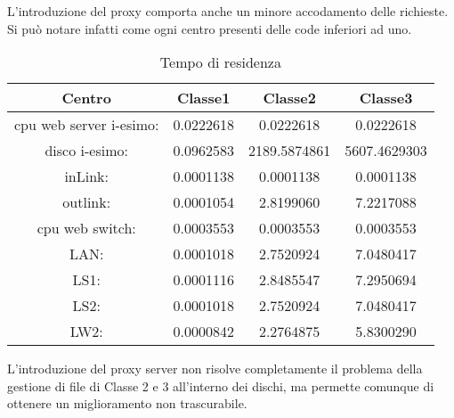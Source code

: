 L'introduzione del proxy comporta anche un minore accodamento delle richieste. Si può notare infatti come ogni centro presenti delle code inferiori ad uno.
\begin{table}[H]
\begin{center}
\begin{tabular}{||c|c|c|c||}
\hline
Centro &Classe1 &Classe2 &Classe3\\
\hline
\hline
 cpu web server i-esimo: 	&0.0222618	&0.0222618	&0.0222618	\\\hline
 disco i-esimo: 	&0.0962583	&2189.5874861	&5607.4629303	\\\hline
 inLink: 	&0.0001138	&0.0001138	&0.0001138	\\\hline
 outlink: 	&0.0001054	&2.8199060	&7.2217088	\\\hline
 cpu web switch: 	&0.0003553	&0.0003553	&0.0003553	\\\hline
 LAN: 	&0.0001018	&2.7520924	&7.0480417	\\\hline
 LS1: 	&0.0001116	&2.8485547	&7.2950694	\\\hline
 LS2: 	&0.0001018	&2.7520924	&7.0480417	\\\hline
 LW2: 	&0.0000842	&2.2764875	&5.8300290	\\\hline
\end{tabular}
\end{center}
\caption{Tempo di residenza}
\label{tempodiresidenza}
\end{table}
L'introduzione del proxy server non risolve completamente il problema della gestione di file di Classe 2 e 3 all'interno dei dischi, ma permette comunque di ottenere un miglioramento non trascurabile.  

